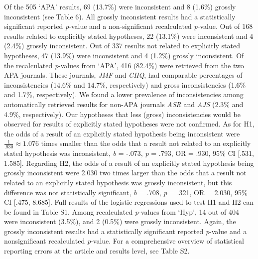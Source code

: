 \documentclass[
  12pt,
]{article}
\begin{document}
Of the 505 `APA' results, 69 (13.7\%) were inconsistent and 8 (1.6\%)
grossly inconsistent (see Table 6). All grossly inconsistent results had
a statistically significant reported \emph{p}-value and a
non-significant recalculated \emph{p}-value. Out of 168 results related
to explicitly stated hypotheses, 22 (13.1\%) were inconsistent and 4
(2.4\%) grossly inconsistent. Out of 337 results not related to
explicitly stated hypotheses, 47 (13.9\%) were inconsistent and 4
(1.2\%) grossly inconsistent. Of the recalculated \emph{p}-values from
`APA', 416 (82.4\%) were retrieved from the two APA journals. These
journals, \emph{JMF} and \emph{CHQ}, had comparable percentages of
inconsistencies (14.6\% and 14.7\%, respectively) and gross
inconsistencies (1.6\% and 1.7\%, respectively). We found a lower
prevalence of inconsistencies among automatically retrieved results for
non-APA journals \emph{ASR} and \emph{AJS} (2.3\% and 4.9\%,
respectively). Our hypotheses that less (gross) inconsistencies would be
observed for results of explicitly stated hypotheses were not confirmed.
As for H1, the odds of a result of an explicitly stated hypothesis being
inconsistent were \(\frac{1}{.930} \approx 1.076\) times smaller than
the odds that a result not related to an explicitly stated hypothesis
was inconsistent, \emph{b} = -.073, \emph{p} = .793, OR = .930, 95\% CI
{[}.531, 1.585{]}. Regarding H2, the odds of a result of an explicitly
stated hypothesis being grossly inconsistent were 2.030 two times larger
than the odds that a result not related to an explicitly stated
hypothesis was grossly inconsistent, but this difference was not
statistically significant, \emph{b} = .708, \emph{p} = .321, OR = 2.030,
95\% CI {[}.475, 8.685{]}. Full results of the logistic regressions used
to test H1 and H2 can be found in Table S1. Among recalculated
\emph{p}-values from `Hyp', 14 out of 404 were inconsistent (3.5\%), and
2 (0.5\%) were grossly inconsistent. Again, the grossly inconsistent
results had a statistically significant reported \emph{p}-value and a
nonsignificant recalculated \emph{p}-value. For a comprehensive overview
of statistical reporting errors at the article and results level, see
Table S2.
\end{document}
